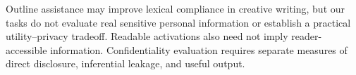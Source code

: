 Outline assistance may improve lexical compliance in creative writing, but our tasks do not evaluate real sensitive personal information or establish a practical utility--privacy tradeoff. Readable activations also need not imply reader-accessible information. Confidentiality evaluation requires separate measures of direct disclosure, inferential leakage, and useful output.
